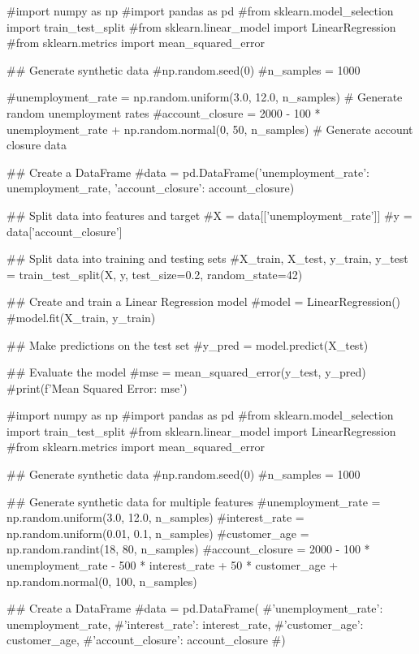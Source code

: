 
#import numpy as np
#import pandas as pd
#from sklearn.model_selection import train_test_split
#from sklearn.linear_model import LinearRegression
#from sklearn.metrics import mean_squared_error

## Generate synthetic data
#np.random.seed(0)
#n_samples = 1000

#unemployment_rate = np.random.uniform(3.0, 12.0, n_samples)  # Generate random unemployment rates
#account_closure = 2000 - 100 * unemployment_rate + np.random.normal(0, 50, n_samples)  # Generate account closure data

## Create a DataFrame
#data = pd.DataFrame({'unemployment_rate': unemployment_rate, 'account_closure': account_closure})

## Split data into features and target
#X = data[['unemployment_rate']]
#y = data['account_closure']

## Split data into training and testing sets
#X_train, X_test, y_train, y_test = train_test_split(X, y, test_size=0.2, random_state=42)

## Create and train a Linear Regression model
#model = LinearRegression()
#model.fit(X_train, y_train)

## Make predictions on the test set
#y_pred = model.predict(X_test)

## Evaluate the model
#mse = mean_squared_error(y_test, y_pred)
#print(f'Mean Squared Error: {mse}')


















#import numpy as np
#import pandas as pd
#from sklearn.model_selection import train_test_split
#from sklearn.linear_model import LinearRegression
#from sklearn.metrics import mean_squared_error

## Generate synthetic data
#np.random.seed(0)
#n_samples = 1000

## Generate synthetic data for multiple features
#unemployment_rate = np.random.uniform(3.0, 12.0, n_samples)
#interest_rate = np.random.uniform(0.01, 0.1, n_samples)
#customer_age = np.random.randint(18, 80, n_samples)
#account_closure = 2000 - 100 * unemployment_rate - 500 * interest_rate + 50 * customer_age + np.random.normal(0, 100, n_samples)

## Create a DataFrame
#data = pd.DataFrame({
    #'unemployment_rate': unemployment_rate,
    #'interest_rate': interest_rate,
    #'customer_age': customer_age,
    #'account_closure': account_closure
#})

